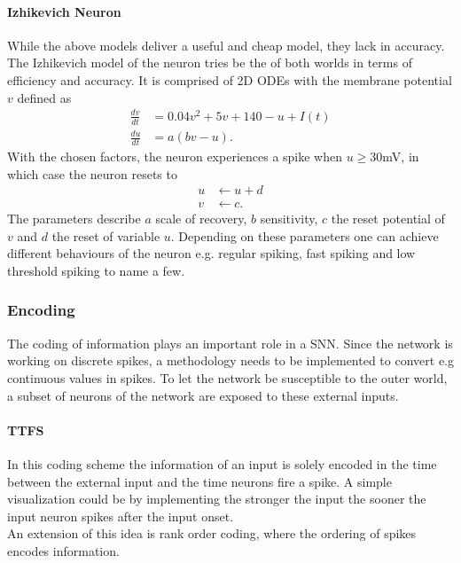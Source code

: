 	\paragraph{Izhikevich Neuron}
	While the above models deliver a useful and cheap model, they lack in accuracy. The Izhikevich model \cite{izhikevich_simple_2003} of the neuron tries be the of both worlds in terms of efficiency and accuracy. It is comprised of 2D ODEs with the membrane potential $v$ defined as
	\begin{equation}
	\begin{aligned}
	\frac{d v}{dt} &= 0.04v^2 + 5v + 140 -u +I(t)\\
	\frac{d u}{dt} &= a(bv-u).
	\end{aligned}
	\end{equation}
	With the chosen factors, the neuron experiences a spike when $u\geq30 $mV, in which case the neuron resets to
	\begin{equation}
	\begin{aligned}
	u &\leftarrow u+d\\
	v&\leftarrow c.
	\end{aligned}
	\end{equation}
	The parameters describe $a$ scale of recovery, $b$ sensitivity, $c$ the reset potential of $v$ and $d$ the reset of variable $u$. Depending on these parameters one can achieve different behaviours of the neuron e.g. regular spiking, fast spiking and low threshold spiking to name a few.

\subsubsection{Encoding}
	The coding of information plays an important role in a \ac{SNN}. Since the network is working on discrete spikes, a methodology needs to be implemented to convert e.g continuous values in spikes. To let the network be susceptible to the outer world, a subset of neurons of the network are exposed to these external inputs.
	\paragraph{\ac{TTFS}}
	In this coding scheme the information of an input is solely encoded in the time between the external input and the time neurons fire a spike. A simple visualization could be by implementing the stronger the input the sooner the input neuron spikes after the input onset.\\
	An extension of this idea is rank order coding, where the ordering of spikes encodes information\cite{thorpe_spike-based_2001}.\\
